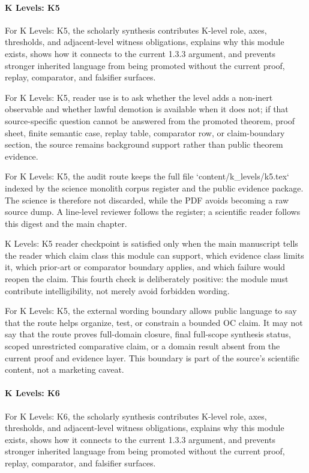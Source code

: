 \paragraph{K Levels: K5}

For K Levels: K5, the scholarly synthesis contributes K-level role, axes, thresholds, and adjacent-level witness obligations, explains why this module exists, shows how it connects to the current 1.3.3 argument, and prevents stronger inherited language from being promoted without the current proof, replay, comparator, and falsifier surfaces.


For K Levels: K5, reader use is to ask whether the level adds a non-inert observable and whether lawful demotion is available when it does not; if that source-specific question cannot be answered from the promoted theorem, proof sheet, finite semantic case, replay table, comparator row, or claim-boundary section, the source remains background support rather than public theorem evidence.


For K Levels: K5, the audit route keeps the full file `content/k\_levels/k5.tex` indexed by the science monolith corpus register and the public evidence package. The science is therefore not discarded, while the PDF avoids becoming a raw source dump. A line-level reviewer follows the register; a scientific reader follows this digest and the main chapter.


K Levels: K5 reader checkpoint is satisfied only when the main manuscript tells the reader which claim class this module can support, which evidence class limits it, which prior-art or comparator boundary applies, and which failure would reopen the claim. This fourth check is deliberately positive: the module must contribute intelligibility, not merely avoid forbidden wording.


For K Levels: K5, the external wording boundary allows public language to say that the route helps organize, test, or constrain a bounded OC claim. It may not say that the route proves full-domain closure, final full-scope synthesis status, scoped unrestricted comparative claim, or a domain result absent from the current proof and evidence layer. This boundary is part of the source's scientific content, not a marketing caveat.


\paragraph{K Levels: K6}

For K Levels: K6, the scholarly synthesis contributes K-level role, axes, thresholds, and adjacent-level witness obligations, explains why this module exists, shows how it connects to the current 1.3.3 argument, and prevents stronger inherited language from being promoted without the current proof, replay, comparator, and falsifier surfaces.


